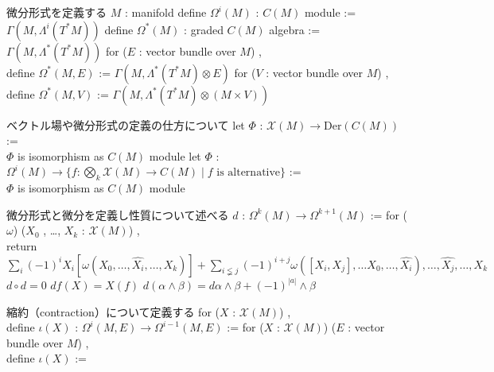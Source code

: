 \begin{Definition}
\itemnote
  微分形式を定義する
\itemwhen \(M\) : manifold
\itemdefi
  define \(\Omega^i(M)\) : \(C(M)\) module := \(\Gamma(M , \Lambda^i(T^*M))\)
\itemdefi
  define \(\Omega^*(M)\) : graded \(C(M)\) algebra := \(\Gamma(M , \Lambda^*(T^*M))\)
\itemdefi
  for (\(E\) : vector bundle over \(M\)) ,\\
  define \(\Omega^*(M , E)\) := \(\Gamma(M , \Lambda^*(T^*M) \otimes E)\)
\itemdefi
  for (\(V\) : vector bundle over \(M\)) ,\\
  define \(\Omega^*(M , V)\) := \(\Gamma(M , \Lambda^*(T^*M) \otimes (M \times V))\)
\end{Definition}

\begin{Theorem}
\itemnote
  ベクトル場や微分形式の定義の仕方について
\itemprop
  let \(\Phi\) : \(\mathcal{X}(M) \to \text{Der}(C(M))\) :=  \\
  \(\Phi\) is isomorphism as \(C(M)\) module
\itemprop
  let \(\Phi\) : \(\Omega^i(M) \to \{f : \bigotimes_k \mathcal{X}(M) \to C(M) \mid f \text{ is alternative}\}\) :=  \\
  \(\Phi\) is isomorphism as \(C(M)\) module
\end{Theorem}

\begin{Proof}
\itemprof
  \WIP
\itemprof
  \WIP
\end{Proof}

\begin{Definition}
\itemnote
  微分形式と微分を定義し性質について述べる
\itemdefi
  \(d\) : \(\Omega^{k}(M) \to \Omega^{k + 1}(M)\) :=
  for (\(\omega\)) (\(X_0\) , \ldots , \(X_k\) : \(\mathcal{X}(M)\)) ,\\
  return \(\sum_i (-1)^i X_i[\omega(X_0 , \ldots , \hat{X_i} , \ldots , X_k)] + \sum_{i \lneqq j} (-1)^{i + j} \omega([X_i , X_j] , \ldots X_0 , \ldots , \hat{X_i}) , \ldots , \hat{X_j} , \ldots , X_k\)
\itemprop
  \(d \circ d = 0\)
\itemprop
  \(df (X) = X(f)\)
\itemprop
  \(d (\alpha \wedge \beta) = d \alpha \wedge \beta + (-1)^{|a|} \wedge \beta\)
\end{Definition}

\begin{Definition}
\itemnote
  縮約（contraction）について定義する
\itemdefi
  for (\(X\) : \(\mathcal{X}(M)\)) ,\\
  define \(\iota(X)\) : \(\Omega^i(M , E) \to \Omega^{i - 1}(M ,E)\) := 
\itemdefi
  for (\(X\) : \(\mathcal{X}(M)\)) (\(E\) : vector bundle over \(M\)) ,\\
  define \(\iota(X)\) := 
\end{Definition}

